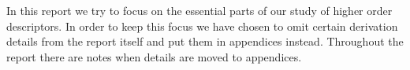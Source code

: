 \documentclass[thesis.tex]{subfiles}
\begin{document}
In this report we try to focus on the essential parts of our study of higher order descriptors. In order to keep this focus we have chosen to omit certain derivation details from the report itself and put them in appendices instead. Throughout the report there are notes when details are moved to appendices.



\subbibliography
\end{document}
